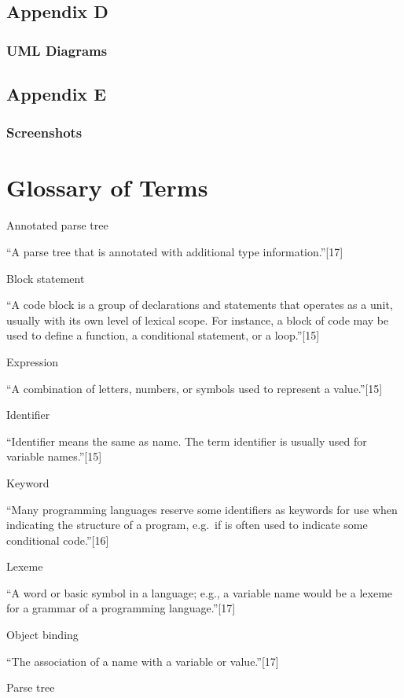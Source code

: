 \documentclass[
]{report}
\begin{document}
\section{Appendix D}
\subsection{UML Diagrams}

\section{Appendix E}
\subsection{Screenshots}

\chapter{Glossary of Terms}
Annotated parse tree

``A parse tree that is annotated with additional type
information.''{[}17{]}

Block statement

``A code block is a group of declarations and statements that operates
as a unit, usually with its own level of lexical scope. For instance, a
block of code may be used to define a function, a conditional statement,
or a loop.''{[}15{]}

Expression

``A combination of letters, numbers, or symbols used to represent a
value.''{[}15{]}

Identifier

``Identifier means the same as name. The term identifier is usually used
for variable names.''{[}15{]}

Keyword

``Many programming languages reserve some identifiers as keywords for
use when indicating the structure of a program, e.g.~if is often used to
indicate some conditional code.''{[}16{]}

Lexeme

``A word or basic symbol in a language; e.g., a variable name would be a
lexeme for a grammar of a programming language.''{[}17{]}

Object binding

``The association of a name with a variable or value.''{[}17{]}

Parse tree
\end{document}
